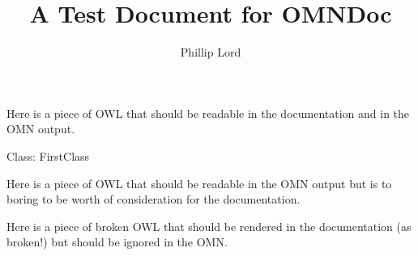 \documentclass{article}
\title{A Test Document for OMNDoc}
\author{Phillip Lord}
\begin{document}
\maketitle

Here is a piece of OWL that should be readable in the documentation and in the
OMN output. 

\begin{omn}
Class: FirstClass
\end{omn}


Here is a piece of OWL that should be readable in the OMN output but is to
boring to be worth of consideration for the documentation. 



Here is a piece of broken OWL that should be rendered in the documentation (as
broken!) but should be ignored in the OMN. 


\end{document}

